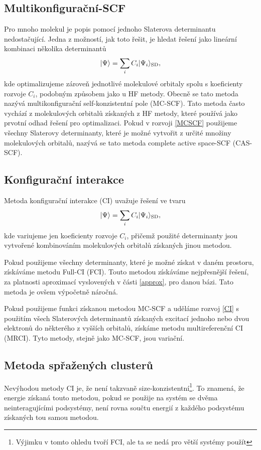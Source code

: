 \subsection{Multikonfigurační-SCF}
Pro mnoho molekul je popis pomocí jednoho Slaterova determinantu nedostačující.
Jedna z možností, jak toto řešit, je hledat řešení jako lineární kombinaci několika determinantů
\begin{equation}
| \Psi \rangle = \sum_i C_i | \Psi_i \rangle_{\mathrm{SD}}, \label{MCSCF}
\end{equation}
kde optimalizujeme zároveň jednotlivé molekulové orbitaly spolu s koeficienty rozvoje $C_i$, 
podobným způsobem jako u HF metody.
Obecně se tato metoda nazývá multikonfigurační self-konzistentní pole (MC-SCF).
Tato metoda často vychází z molekulových orbitalů získaných z HF metody, které používá jako 
prvotní odhad řešení pro optimalizaci.
Pokud v rozvoji \eqref{MCSCF} použijeme všechny Slaterovy determinanty, které je možné  
vytvořit z určité množiny molekulových orbitalů, nazývá se tato metoda complete active 
space-SCF (CAS-SCF). 

\subsection{Konfigurační interakce}
Metoda konfigurační interakce (CI) uvažuje řešení ve tvaru
\begin{equation}
| \Psi \rangle = \sum_i C_i | \Psi_i \rangle_{\mathrm{SD}}, \label{CI}
\end{equation}
kde variujeme jen koeficienty rozvoje $C_i$, přičemž použité determinanty jsou 
vytvořené kombinováním molekulových orbitalů získaných jinou metodou. 

Pokud použijeme všechny determinanty, které je možné získat v daném prostoru, 
získáváme metodu Full-CI (FCI). Touto metodou získáváme nejpřesnější řešení, za 
platnosti aproximací vyslovených v části \ref{approx}, pro danou bázi. Tato metoda je 
ovšem výpočetně náročná.

Pokud použijeme funkci získanou metodou MC-SCF a uděláme rozvoj \ref{CI} s použitím všech Slaterových determinantů získaných 
excitací jednoho nebo dvou elektronů do některého z vyšších orbitalů,
získáme metodu
multireferenční CI (MRCI). Tyto metody, stejně jako MC-SCF, jsou variační.

\subsection{Metoda spřažených clusterů}
Nevýhodou metody CI je, že není takzvaně size-konzistentní\footnote{Výjimku v tomto 
ohledu tvoří FCI, ale ta se nedá pro větší systémy použít}. To znamená, že energie 
získaná touto metodou, pokud se použije na systém se dvěma neinteragujícími podsystémy,
není rovna součtu energií z každého podsystému získaných tou samou metodou. 

